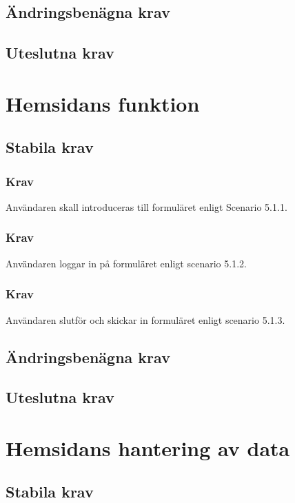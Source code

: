 \documentclass{article}
\begin{document}
    \subsection{Ändringsbenägna krav}
    \subsection{Uteslutna krav}
    
    \section{Hemsidans funktion}
    
    \subsection{Stabila krav}
    
     \subsubsection{Krav}
    Användaren skall introduceras till formuläret enligt Scenario 5.1.1.
    
    \subsubsection{Krav}
    Användaren loggar in på formuläret enligt scenario 5.1.2.
    
    \subsubsection{Krav}
    Användaren slutför och skickar in formuläret enligt scenario 5.1.3.
    
    \subsection{Ändringsbenägna krav}
    \subsection{Uteslutna krav}
    
    \newpage
     \section{Hemsidans hantering av data}
    
    \subsection{Stabila krav}
\end{document}
